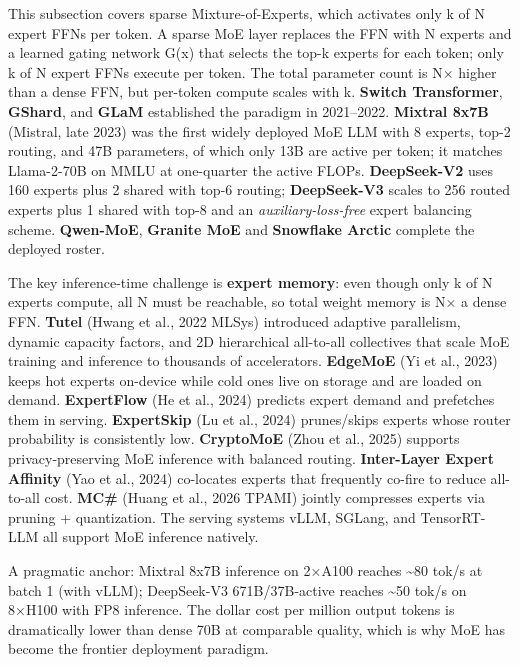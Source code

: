 This subsection covers sparse Mixture-of-Experts, which activates only k of N expert FFNs per token. A sparse MoE layer replaces the FFN with N experts and a learned gating network G(x) that selects the top-k experts for each token; only k of N expert FFNs execute per token. The total parameter count is N× higher than a dense FFN, but per-token compute scales with k. \textbf{Switch Transformer}, \textbf{GShard}, and \textbf{GLaM} established the paradigm in 2021--2022. \textbf{Mixtral 8x7B} (Mistral, late 2023) was the first widely deployed MoE LLM with 8 experts, top-2 routing, and 47B parameters, of which only 13B are active per token; it matches Llama-2-70B on MMLU at one-quarter the active FLOPs. \textbf{DeepSeek-V2} uses 160 experts plus 2 shared with top-6 routing; \textbf{DeepSeek-V3} scales to 256 routed experts plus 1 shared with top-8 and an \emph{auxiliary-loss-free} expert balancing scheme. \textbf{Qwen-MoE}, \textbf{Granite MoE} and \textbf{Snowflake Arctic} complete the deployed roster.

The key inference-time challenge is \textbf{expert memory}: even though only k of N experts compute, all N must be reachable, so total weight memory is N× a dense FFN. \textbf{Tutel} (Hwang et al., 2022 MLSys) introduced adaptive parallelism, dynamic capacity factors, and 2D hierarchical all-to-all collectives that scale MoE training and inference to thousands of accelerators. \textbf{EdgeMoE} (Yi et al., 2023) keeps hot experts on-device while cold ones live on storage and are loaded on demand. \textbf{ExpertFlow} (He et al., 2024) predicts expert demand and prefetches them in serving. \textbf{ExpertSkip} (Lu et al., 2024) prunes/skips experts whose router probability is consistently low. \textbf{CryptoMoE} (Zhou et al., 2025) supports privacy-preserving MoE inference with balanced routing. \textbf{Inter-Layer Expert Affinity} (Yao et al., 2024) co-locates experts that frequently co-fire to reduce all-to-all cost. \textbf{MC\#} (Huang et al., 2026 TPAMI) jointly compresses experts via pruning + quantization. The serving systems vLLM, SGLang, and TensorRT-LLM all support MoE inference natively.

A pragmatic anchor: Mixtral 8x7B inference on 2×A100 reaches \textasciitilde80 tok/s at batch 1 (with vLLM); DeepSeek-V3 671B/37B-active reaches \textasciitilde50 tok/s on 8×H100 with FP8 inference. The dollar cost per million output tokens is dramatically lower than dense 70B at comparable quality, which is why MoE has become the frontier deployment paradigm.

